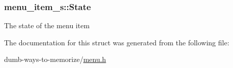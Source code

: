 \subsubsection[{\texorpdfstring{State}{State}}]{ menu\+\_\+item\+\_\+s\+::\+State}\hypertarget{structmenu__item__s_a5b54d5038e642351205745ebeae836e4}{}\label{structmenu__item__s_a5b54d5038e642351205745ebeae836e4}
The state of the menu item 

The documentation for this struct was generated from the following file\+:\begin{DoxyCompactItemize}
\item 
dumb-\/ways-\/to-\/memorize/\hyperlink{menu_8h}{menu.\+h}\end{DoxyCompactItemize}
